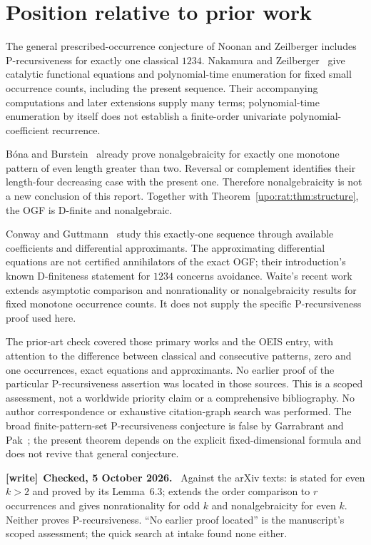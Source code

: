 \documentclass[11pt,letterpaper]{article}
\theoremstyle{remark}\newtheorem{remark}[theorem]{Remark}
\numberwithin{equation}{section}
\newenvironment{writenote}[1][]{\par\smallskip\begingroup\small
 \noindent\textbf{[write]}\if\relax\detokenize{#1}\relax\else~\textbf{#1.}\fi\ }%
 {\par\endgroup\smallskip}
\begin{document}
\section{Position relative to prior work}\label{upo:rat:sec:prior}
The general prescribed-occurrence conjecture of Noonan and Zeilberger
\cite[Introduction]{NoonanZ} includes P-recursiveness for exactly one
classical $1234$. Nakamura and Zeilberger~\cite{NZ} give catalytic
functional equations and polynomial-time enumeration for fixed small
occurrence counts, including the present sequence. Their accompanying
computations and later extensions supply many terms; polynomial-time
enumeration by itself does not establish a finite-order univariate
polynomial-coefficient recurrence.

B\'ona and Burstein~\cite[Theorem 6.2]{BB} already prove nonalgebraicity
for exactly one monotone pattern of even length greater than two.
Reversal or complement identifies their length-four decreasing case
with the present one. Therefore nonalgebraicity is not a new conclusion
of this report. Together with Theorem~\ref{upo:rat:thm:structure}, the OGF is
D-finite and nonalgebraic.

Conway and Guttmann~\cite[Section 5.1]{CG} study this exactly-one
sequence through available coefficients and differential approximants.
The approximating differential equations are not certified annihilators
of the exact OGF; their introduction's known D-finiteness statement for
$1234$ concerns avoidance. Waite's recent work~\cite{Waite} extends
asymptotic comparison and nonrationality or nonalgebraicity results for
fixed monotone occurrence counts. It does not supply the specific
P-recursiveness proof used here.

The prior-art check covered those primary works and the OEIS entry,
with attention to the difference between classical and consecutive
patterns, zero and one occurrences, exact equations and approximants.
No earlier proof of the particular P-recursiveness assertion was located
in those sources. This is a scoped assessment, not a worldwide priority
claim or a comprehensive bibliography. No author correspondence or
exhaustive citation-graph search was performed. The broad
finite-pattern-set P-recursiveness conjecture is false by
Garrabrant and Pak~\cite{GP}; the present theorem depends on the explicit
fixed-dimensional formula and does not revive that general conjecture.
\begin{writenote}[Checked, 5 October 2026]
Against the arXiv texts: \cite[Theorem 6.2]{BB} is stated for even $k>2$ and proved by its Lemma~6.3; \cite[Corollary 4.4]{Waite} extends the order comparison to $r$ occurrences and gives nonrationality for odd $k$ and nonalgebraicity for even $k$. Neither proves P-recursiveness. ``No earlier proof located'' is the manuscript's scoped assessment; the quick search at intake found none either.
\end{writenote}
\end{document}
